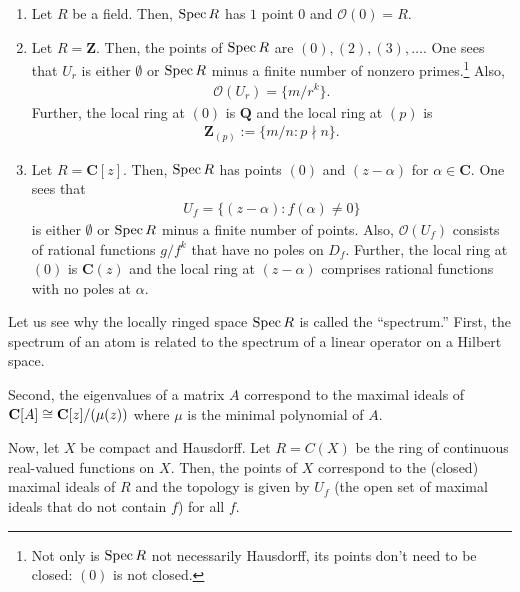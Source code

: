 \documentclass [11 pt, oneside, margin = 1 in] {article}
\begin{document}
\begin{example}[ ]\label{}\text{}
\begin{enumerate}
	\item Let $R$ be a field. Then, $\operatorname{Spec} R$ has $1$ point $0$ and $\mathscr{O}(0)= R$.
	\item Let $R=\mathbf{Z}$. Then, the points of $\operatorname{Spec} R$ are $(0),  (2),  (3),\hdots$. One sees that $U_r$ is either $\emptyset$ or $\operatorname{Spec} R$ minus a finite number of nonzero primes.\footnote{Not only is $\operatorname{Spec} R$ not necessarily Hausdorff, its points don't need to be closed: $(0)$ is not closed.} Also,
		 \begin{align*}
		 	\mathscr{O}(U_r) = \{ m/r^k\}.
		 \end{align*}
		 Further, the local ring at $(0)$ is $\mathbf{Q}$ and the local ring at $(p)$ is
		 \begin{align*}
		 	\mathbf{Z}_{(p)} := \{ m/n:p\nmid n\}.
		 \end{align*}
	 \item Let $R=\mathbf{C}[z]$. Then, $\operatorname{Spec} R$ has points $(0)$ and $(z-\alpha)$ for $\alpha\in \mathbf{C}$. One sees that 
\begin{align*}
	U_f = \{ (z-\alpha) : f (\alpha)\ne 0\}
\end{align*}
is either $\emptyset$ or $\operatorname{Spec} R$ minus a finite number of points. Also, $\mathscr{O}(U_f)$ consists of rational functions $g/f^k$ that have no poles on $D_f$. Further, the local ring at $(0)$ is $\mathbf{C}(z)$ and the local ring at $(z-\alpha)$ comprises rational functions with no poles at $\alpha$.
\end{enumerate}
\end{example}

Let us see why the locally ringed space $\operatorname{Spec} R$ is called the ``spectrum.'' First, the spectrum of an atom is related to the spectrum of a linear operator on a Hilbert space. 

Second, the eigenvalues of a matrix $A$ correspond to the maximal ideals of $\mathbf{C}[A]\cong \mathbf{C}[z]/(\mu(z))$ where $\mu$ is the minimal polynomial of $A$. 

Now, let $X$ be compact and Hausdorff. Let $R=C(X)$ be the ring of continuous real-valued functions on $X$. Then, the points of $X$ correspond to the (closed) maximal ideals of $R$ and the topology is given by $U_f$ (the open set of maximal ideals that do not contain $f$) for all $f$.
\end{document}
